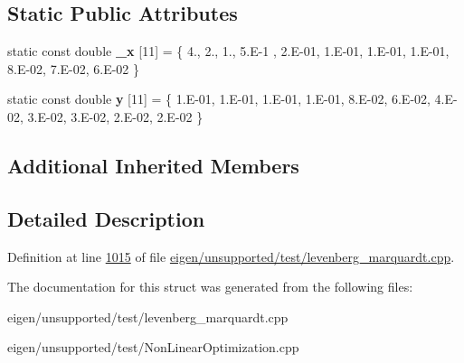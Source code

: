 \subsection*{Static Public Attributes}
\begin{DoxyCompactItemize}
\item 
\mbox{\label{struct_m_g_h09__functor_acf81321bdfad0b819d2d621d3070e797}} 
static const double {\bfseries \+\_\+x} \mbox{[}11\mbox{]} = \{ 4., 2., 1., 5.E-\/1 , 2.\+E-\/01, 1.\+E-\/01, 1.\+E-\/01, 1.\+E-\/01, 8.\+E-\/02, 7.\+E-\/02, 6.\+E-\/02 \}
\item 
\mbox{\label{struct_m_g_h09__functor_aaeae65648e136a5e68486c41fe81f121}} 
static const double {\bfseries y} \mbox{[}11\mbox{]} = \{ 1.\+E-\/01, 1.\+E-\/01, 1.\+E-\/01, 1.\+E-\/01, 8.\+E-\/02, 6.\+E-\/02, 4.\+E-\/02, 3.\+E-\/02, 3.\+E-\/02, 2.\+E-\/02, 2.\+E-\/02 \}
\end{DoxyCompactItemize}
\subsection*{Additional Inherited Members}


\subsection{Detailed Description}


Definition at line \hyperlink{eigen_2unsupported_2test_2levenberg__marquardt_8cpp_source_l01015}{1015} of file \hyperlink{eigen_2unsupported_2test_2levenberg__marquardt_8cpp_source}{eigen/unsupported/test/levenberg\+\_\+marquardt.\+cpp}.



The documentation for this struct was generated from the following files\+:\begin{DoxyCompactItemize}
\item 
eigen/unsupported/test/levenberg\+\_\+marquardt.\+cpp\item 
eigen/unsupported/test/\+Non\+Linear\+Optimization.\+cpp\end{DoxyCompactItemize}

